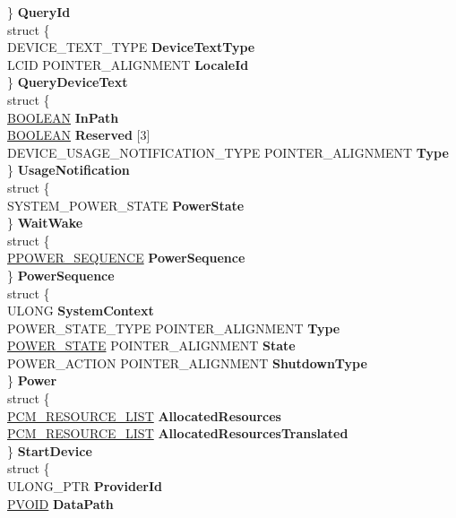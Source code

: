 \begin{DoxyCompactItemize}
\begin{tabbing}
\>\} {\bfseries QueryId}\\
\>struct \{\\
\>\>DEVICE\_TEXT\_TYPE {\bfseries DeviceTextType}\\
\>\>LCID POINTER\_ALIGNMENT {\bfseries LocaleId}\\
\>\} {\bfseries QueryDeviceText}\\
\>struct \{\\
\>\>\hyperlink{_processor_bind_8h_a112e3146cb38b6ee95e64d85842e380a}{BOOLEAN} {\bfseries InPath}\\
\>\>\hyperlink{_processor_bind_8h_a112e3146cb38b6ee95e64d85842e380a}{BOOLEAN} {\bfseries Reserved} \mbox{[}3\mbox{]}\\
\>\>DEVICE\_USAGE\_NOTIFICATION\_TYPE POINTER\_ALIGNMENT {\bfseries Type}\\
\>\} {\bfseries UsageNotification}\\
\>struct \{\\
\>\>SYSTEM\_POWER\_STATE {\bfseries PowerState}\\
\>\} {\bfseries WaitWake}\\
\>struct \{\\
\>\>\hyperlink{struct___p_o_w_e_r___s_e_q_u_e_n_c_e}{PPOWER\_SEQUENCE} {\bfseries PowerSequence}\\
\>\} {\bfseries PowerSequence}\\
\>struct \{\\
\>\>ULONG {\bfseries SystemContext}\\
\>\>POWER\_STATE\_TYPE POINTER\_ALIGNMENT {\bfseries Type}\\
\>\>\hyperlink{union___p_o_w_e_r___s_t_a_t_e}{POWER\_STATE} POINTER\_ALIGNMENT {\bfseries State}\\
\>\>POWER\_ACTION POINTER\_ALIGNMENT {\bfseries ShutdownType}\\
\>\} {\bfseries Power}\\
\>struct \{\\
\>\>\hyperlink{struct___c_m___r_e_s_o_u_r_c_e___l_i_s_t}{PCM\_RESOURCE\_LIST} {\bfseries AllocatedResources}\\
\>\>\hyperlink{struct___c_m___r_e_s_o_u_r_c_e___l_i_s_t}{PCM\_RESOURCE\_LIST} {\bfseries AllocatedResourcesTranslated}\\
\>\} {\bfseries StartDevice}\\
\>struct \{\\
\>\>ULONG\_PTR {\bfseries ProviderId}\\
\>\>\hyperlink{interfacevoid}{PVOID} {\bfseries DataPath}\\

\end{tabbing}
\end{DoxyCompactItemize}
